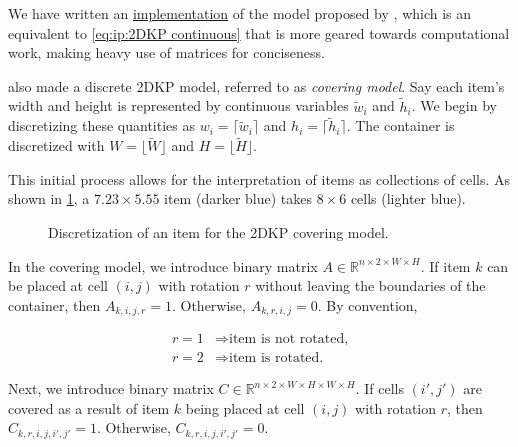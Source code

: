 We have written an \href{https://github.com/phcentenaro7/IC-Knapsack/blob/957b87062cb846a6e30e7c0a9246ad8b6f7bd189/Knapsack/Kalvelagen/jump_2dknapsack_continuous.jl}{implementation} of the model proposed by \textcite{KALVELAGEN2021}, which is an equivalent to \cref{eq:ip:2DKP continuous} that is more geared towards computational work, making heavy use of matrices for conciseness.

\textcite{KALVELAGEN2021} also made a discrete 2DKP model, referred to as \emph{covering model}. Say each item's width and height is represented by continuous variables $\tilde{w}_i$ and $\tilde{h}_i$. We begin by discretizing these quantities as $w_i = \lceil\tilde{w}_i\rceil$ and $h_i = \lceil\tilde{h}_i\rceil$. The container is discretized with $W = \lfloor\tilde{W}\rfloor$ and $H = \lfloor\tilde{H}\rfloor$.

This initial process allows for the interpretation of items as collections of cells. As shown in \cref{fig:2DKP covering discretization example}, a $7.23 \times 5.55$ item (darker blue) takes $8 \times 6$ cells (lighter blue).

\begin{figure}[h]
    \centering
    \caption{Discretization of an item for the 2DKP covering model.}
    \label{fig:2DKP covering discretization example}
\end{figure}

In the covering model, we introduce binary matrix $A \in \mathbb{R}^{n \times 2 \times W \times H}$. If item $k$ can be placed at cell $(i,j)$ with rotation $r$ without leaving the boundaries of the container, then $A_{k,i,j,r} = 1$. Otherwise, $A_{k,r,i,j} = 0$. By convention,

\begin{align}
    r = 1& \Rightarrow \text{item is not rotated,}\nonumber\\
    r = 2& \Rightarrow \text{item is rotated.}\nonumber
\end{align}

Next, we introduce binary matrix $C \in \mathbb{R}^{n \times 2 \times W \times H \times W \times H}$. If cells $(i',j')$ are covered as a result of item $k$ being placed at cell $(i,j)$ with rotation $r$, then $C_{k,r,i,j,i',j'} = 1$. Otherwise, $C_{k,r,i,j,i',j'} = 0$.

